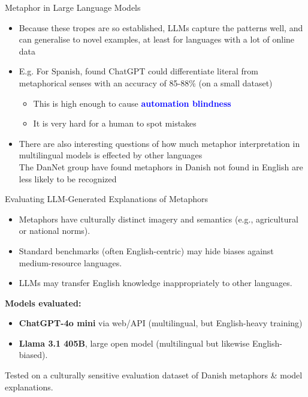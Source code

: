 \documentclass[xetex]{beamer}  %
\newcommand{\txx}[1]{\textbf{\textcolor{blue}{#1}}}
\begin{document}
\begin{frame}{Metaphor in Large Language Models}
  \begin{itemize}
  \item Because these tropes are so established, LLMs capture the
    patterns well, and can generalise to novel examples, at least for languages with a lot of online data
  \item E.g. For Spanish, \citet{puraivan2024metaphor} found ChatGPT
    could differentiate literal from metaphorical senses with an
    accuracy of 85-88\% (on a small dataset)
    \begin{itemize}
    \item This is high enough to cause \txx{automation blindness}
    \item It is very hard for a human to spot mistakes
    \end{itemize}
  \item There are also interesting questions of how much metaphor
    interpretation in multilingual models is effected by other languages
    \\ The DanNet group have found metaphors in Danish not found in English are less likely to be recognized

  \end{itemize}%

  
 \end{frame}

 \begin{frame}{Evaluating LLM-Generated Explanations of Metaphors
     \citep{Pedersen:Soerensen:Nimb:Hansen:Olsen:Al-Laith:2025} }

\begin{itemize}
  \item Metaphors have culturally distinct imagery and semantics (e.g., agricultural or national norms).
  \item Standard benchmarks (often English-centric) may hide biases against medium-resource languages.
  \item  LLMs may transfer English knowledge inappropriately to other languages.
\end{itemize}

\smallskip
\textbf{Models evaluated:}
\begin{itemize}
  \item \textbf{ChatGPT-4o mini} via web/API (multilingual, but English-heavy training)
  \item \textbf{Llama 3.1 405B}, large open model (multilingual but likewise English-biased).
\end{itemize}

\smallskip
Tested on a  culturally sensitive evaluation dataset of Danish metaphors \& model explanations.
\end{frame}
\end{document}
